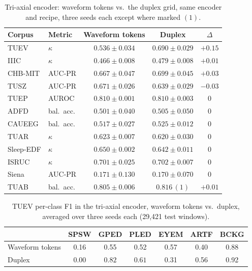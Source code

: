 \begin{table}[h]
\centering
\small
\caption{Tri-axial encoder: waveform tokens vs.\ the duplex grid, same
encoder and recipe, three seeds each except where marked $(1)$.}
\label{tab:coupling-triaxial}
\begin{tabular}{llccc}
\toprule
Corpus & Metric & Waveform tokens & Duplex & $\Delta$ \\
\midrule
TUEV & $\kappa$ & $0.536 \pm 0.034$ & $0.690 \pm 0.029$ & $\mathbf{+0.15}$ \\
IIIC & $\kappa$ & $0.466 \pm 0.008$ & $0.479 \pm 0.008$ & $+0.01$ \\
CHB-MIT & AUC-PR & $0.667 \pm 0.047$ & $0.699 \pm 0.045$ & $+0.03$ \\
TUSZ & AUC-PR & $0.671 \pm 0.026$ & $0.639 \pm 0.029$ & $-0.03$ \\
TUEP & AUROC & $0.810 \pm 0.001$ & $0.810 \pm 0.003$ & $0$ \\
ADFD & bal.\ acc. & $0.501 \pm 0.040$ & $0.505 \pm 0.050$ & $0$ \\
CAUEEG & bal.\ acc. & $0.517 \pm 0.027$ & $0.525 \pm 0.012$ & $0$ \\
TUAR & $\kappa$ & $0.623 \pm 0.007$ & $0.620 \pm 0.030$ & $0$ \\
Sleep-EDF & $\kappa$ & $0.650 \pm 0.002$ & $0.642 \pm 0.011$ & $0$ \\
ISRUC & $\kappa$ & $0.701 \pm 0.025$ & $0.702 \pm 0.007$ & $0$ \\
Siena & AUC-PR & $0.171 \pm 0.130$ & $0.170 \pm 0.070$ & $0$ \\
TUAB & bal.\ acc. & $0.805 \pm 0.006$ & $0.816\,(1)$ & $+0.01$ \\
\bottomrule
\end{tabular}
\end{table}

\begin{table}[h]
\centering
\small
\caption{TUEV per-class F1 in the tri-axial encoder, waveform tokens vs.\
duplex, averaged over three seeds each (29,421 test windows).}
\label{tab:perclass}
\begin{tabular}{lcccccc}
\toprule
 & SPSW & GPED & PLED & EYEM & ARTF & BCKG \\
\midrule
Waveform tokens & 0.16 & 0.55 & 0.52 & 0.57 & 0.40 & 0.88 \\
Duplex & 0.00 & $\mathbf{0.82}$ & $\mathbf{0.61}$ & 0.31 & 0.56 & 0.92 \\
\bottomrule
\end{tabular}
\end{table}

